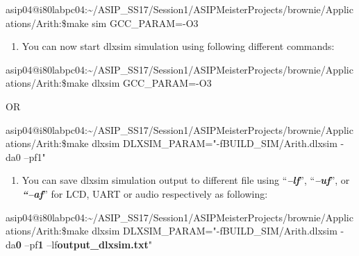 \documentclass[
]{article}
\begin{document}
asip04@i80labpc04:\textasciitilde/ASIP\_SS17/Session1/ASIPMeisterProjects/brownie/Applications/Arith:\$make
sim GCC\_PARAM=-O3

\begin{enumerate}
\def\labelenumi{\arabic{enumi}.}
\setcounter{enumi}{10}
\item
  You can now start dlxsim simulation using following different
  commands:
\end{enumerate}

asip04@i80labpc04:\textasciitilde/ASIP\_SS17/Session1/ASIPMeisterProjects/brownie/Applications/Arith:\$make
dlxsim GCC\_PARAM=-O3

OR

asip04@i80labpc04:\textasciitilde/ASIP\_SS17/Session1/ASIPMeisterProjects/brownie/Applications/Arith:\$make
dlxsim DLXSIM\_PARAM="-fBUILD\_SIM/Arith.dlxsim -da0 --pf1"

\begin{enumerate}
\def\labelenumi{\arabic{enumi}.}
\setcounter{enumi}{11}
\item
  You can save dlxsim simulation output to different file using
  ``\emph{\textbf{--lf}}'', ``\emph{\textbf{--uf}}'', or
  \emph{\textbf{``--af}}'' for LCD, UART or audio respectively as
  following:
\end{enumerate}

asip04@i80labpc04:\textasciitilde/ASIP\_SS17/Session1/ASIPMeisterProjects/brownie/Applications/Arith:\$make
dlxsim DLXSIM\_PARAM="-fBUILD\_SIM/Arith.dlxsim -da\textbf{0}
--pf\textbf{1} --lf\textbf{output\_dlxsim.txt}"
\end{document}
